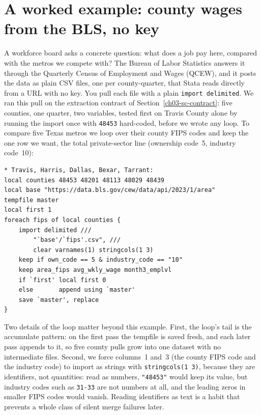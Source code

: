 \section{A worked example: county wages from the BLS, no key}\label{sec:qcew}
A workforce board asks a concrete question: what does a job pay here, compared with the metros we compete with? The Bureau of Labor Statistics answers it through the Quarterly Census of Employment and Wages (QCEW), and it posts the data as plain CSV files, one per county-quarter, that Stata reads directly from a URL with no key. You pull each file with a plain \texttt{import delimited}. We ran this pull on the extraction contract of Section~\ref{ch03-sc-contract}: five counties, one quarter, two variables, tested first on Travis County alone by running the import once with \texttt{48453} hard-coded, before we wrote any loop. To compare five Texas metros we loop over their county FIPS codes and keep the one row we want, the total private-sector line (ownership code~5, industry code~10):
\par
{\footnotesize
\begin{verbatim}
* Travis, Harris, Dallas, Bexar, Tarrant:
local counties 48453 48201 48113 48029 48439
local base "https://data.bls.gov/cew/data/api/2023/1/area"
tempfile master
local first 1
foreach fips of local counties {
    import delimited ///
        "`base'/`fips'.csv", ///
        clear varnames(1) stringcols(1 3)
    keep if own_code == 5 & industry_code == "10"
    keep area_fips avg_wkly_wage month3_emplvl
    if `first' local first 0
    else       append using `master'
    save `master', replace
}
\end{verbatim}
}
Two details of the loop matter beyond this example. First, the loop's tail is the accumulate pattern: on the first pass the tempfile is saved fresh, and each later pass appends to it, so five county pulls grow into one dataset with no intermediate files. Second, we force columns~1 and~3 (the county FIPS code and the industry code) to import as strings with \texttt{stringcols(1 3)}, because they are identifiers, not quantities: read as numbers, \texttt{"48453"} would keep its value, but industry codes such as \texttt{31-33} are not numbers at all, and the leading zeros in smaller FIPS codes would vanish. Reading identifiers as text is a habit that prevents a whole class of silent merge failures later.

